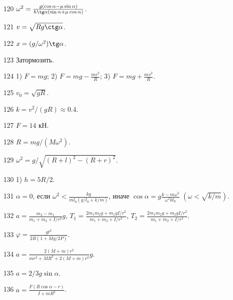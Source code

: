 \begin{Answer}{120}
$\omega^2 = \frac{g(\cos \alpha - \mu \sin \alpha)}{h \tg \alpha (\sin \alpha + \mu \cos \alpha)}$.
\end{Answer}
\begin{Answer}{121}
$v = \sqrt{Rg \ctg \alpha}$.
\end{Answer}
\begin{Answer}{122}
$x = (g/\omega^2) \tg \alpha$.
\end{Answer}
\begin{Answer}{123}
Затормозить.
\end{Answer}
\begin{Answer}{124}
1) $F=mg$; 2) $F=mg-\frac{mv^2}{R}$; 3) $F=mg+\frac{mv^2}{R}$.
\end{Answer}
\begin{Answer}{125}
$v_0 = \sqrt{gR}$.
\end{Answer}
\begin{Answer}{126}
$k=v^2/(gR) \approx 0.4$.
\end{Answer}
\begin{Answer}{127}
$F = 14$ кН.
\end{Answer}
\begin{Answer}{128}
$R = mg/(M\omega^2)$.
\end{Answer}
\begin{Answer}{129}
$\omega^2 = g/\sqrt{(R+l)^2-(R+r)^2}$.
\end{Answer}
\begin{Answer}{130}
1) $h=5R/2$.
\end{Answer}
\begin{Answer}{131}
$\alpha = 0$, если $\omega^2 < \frac{kg}{ml_0(g/l_0 + k/m)}$, иначе $\cos \alpha = g\frac{k-m\omega^2}{\omega^2kl_0}$ $\left( \omega < \sqrt{k/m} \right)$.
\end{Answer}
\begin{Answer}{132}
$a= \frac{m_2-m_1}{m_1+m_2+I/r^2}g$, $T_1 = \frac{2m_1m_2g + m_1gI/r^2}{m_1+m_2+I/r^2}$, $T_2 = \frac{2m_1m_2g + m_2gI/r^2}{m_1+m_2+I/r^2}$.
\end{Answer}
\begin{Answer}{133}
$\varphi = \frac{gt^2}{2R(1+Mg/2P)}$.
\end{Answer}
\begin{Answer}{134}
$a = \frac{2(M+m)r^2}{mr^2+MR^2+2(M+m)r^2}g$.
\end{Answer}
\begin{Answer}{135}
$a=2/3g\sin \alpha$.
\end{Answer}
\begin{Answer}{136}
$a = \frac{F(R\cos \alpha - r)}{I + mR^2}$.
\end{Answer}

